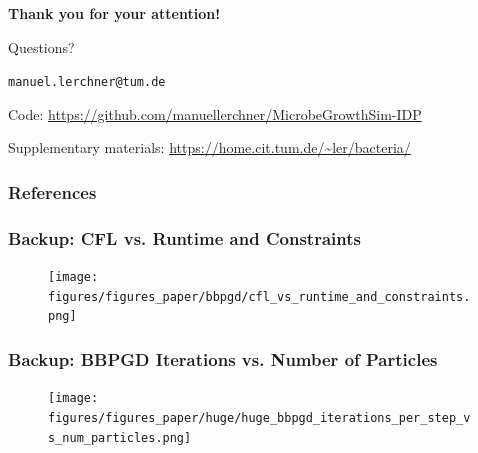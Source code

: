 \documentclass[10pt,t]{beamer}
\begin{document}
\begin{frame}
    \begin{center}
        \vspace{1cm}
        {\LARGE \textbf{Thank you for your attention!}}

        \vspace{1.5cm}

        \Huge{Questions?}

        \vspace{.8cm}

        \small
        \texttt{manuel.lerchner@tum.de}

        \vspace{0.3cm}
        Code: \url{https://github.com/manuellerchner/MicrobeGrowthSim-IDP}

        \vspace{0.2cm}
        Supplementary materials: \url{https://home.cit.tum.de/~ler/bacteria/}
    \end{center}
\end{frame}

\begin{frame}
    \frametitle{References}
    \scriptsize
    
    
\end{frame}

\appendix

\begin{frame}
    \frametitle{Backup: CFL vs. Runtime and Constraints}

    \begin{figure}
        \centering
        \texttt{[image: figures/figures\_paper/bbpgd/cfl\_vs\_runtime\_and\_constraints.png]}
    \end{figure}
\end{frame}

\begin{frame}
    \frametitle{Backup: BBPGD Iterations vs. Number of Particles}

    \begin{figure}
        \centering
        \texttt{[image: figures/figures\_paper/huge/huge\_bbpgd\_iterations\_per\_step\_vs\_num\_particles.png]}
    \end{figure}
\end{frame}
\end{document}
